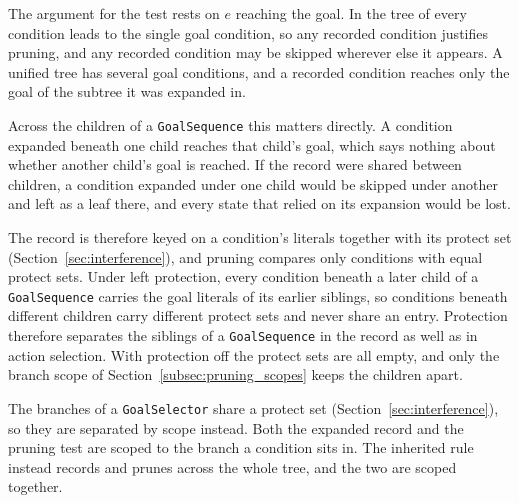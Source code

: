     \label{subsec:pruning_and_protect}
    The argument for the test rests on $e$ reaching the goal.
    In the tree of \probone every condition leads to the single goal condition, so any recorded condition justifies pruning, and any recorded condition may be skipped wherever else it appears.
    A unified tree has several goal conditions, and a recorded condition reaches only the goal of the subtree it was expanded in.
 
    Across the children of a \texttt{GoalSequence} this matters directly.
    A condition expanded beneath one child reaches that child's goal, which says nothing about whether another child's goal is reached.
    If the record were shared between children, a condition expanded under one child would be skipped under another and left as a leaf there, and every state that relied on its expansion would be lost.
 
    The record is therefore keyed on a condition's literals together with its protect set (Section~\ref{sec:interference}), and pruning compares only conditions with equal protect sets.
    Under left protection, every condition beneath a later child of a \texttt{GoalSequence} carries the goal literals of its earlier siblings, so conditions beneath different children carry different protect sets and never share an entry.
    Protection therefore separates the siblings of a \texttt{GoalSequence} in the record as well as in action selection.
    With protection off the protect sets are all empty, and only the branch scope of Section~\ref{subsec:pruning_scopes} keeps the children apart.
 
    \label{subsec:pruning_scopes}
    The branches of a \texttt{GoalSelector} share a protect set (Section~\ref{sec:interference}), so they are separated by scope instead.
    Both the expanded record and the pruning test are scoped to the branch a condition sits in.
    The inherited rule instead records and prunes across the whole tree, and the two are scoped together.
 
